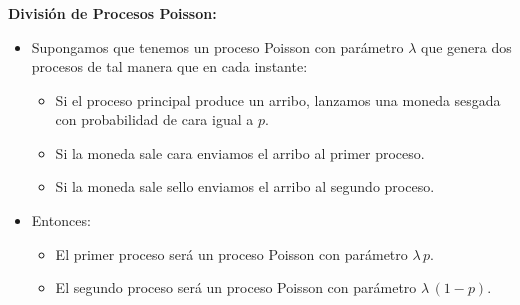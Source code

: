 \documentclass[ 10pt, xcolor = dvipsnames]{beamer}
\begin{document}
\begin{frame}[allowframebreaks]
\frametitle{\insertsection}

\textbf{Divisi\'on de Procesos Poisson:}
\begin{itemize}
\item Supongamos que tenemos un proceso Poisson con par\'ametro $\lambda$ que genera dos procesos de tal manera que en cada instante: 
\begin{itemize}
\item Si el proceso principal produce un arribo, lanzamos una moneda sesgada con probabilidad de cara igual a $p$. 
\item Si la moneda sale cara enviamos el arribo al primer proceso. 
\item Si la moneda sale sello enviamos el arribo al segundo proceso. 
\end{itemize}
\item Entonces: 
\begin{itemize}
\item El primer proceso ser\'a un proceso Poisson con par\'ametro $\lambda \, p$. 
\item El segundo proceso ser\'a un proceso Poisson con par\'ametro $\lambda \, (1-p)$. 
\end{itemize}
\end{itemize}

\end{frame}
\end{document}
